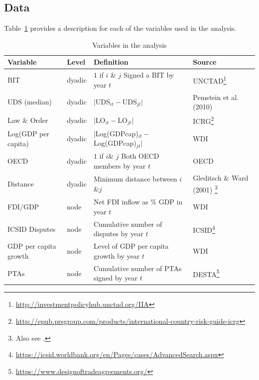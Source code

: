 \documentclass[a4paper, 12pt]{article}
\begin{document}
\subsection{Data}

Table~\ref{tab:vars} provides a description for each of the variables used in the analysis.

\begin{table}[ht]
\footnotesize
  \centering
  \caption{Variables in the analysis}\label{tab:modelSpec}
  \begin{tabular}{llp{7cm}p{4cm}}  
    \toprule
    Variable & Level & Definition & Source \\
    \midrule
    BIT & dyadic & $1$ if $i$ \& $j$ Signed a BIT by year $t$ & UNCTAD\footnote{\url{http://investmentpolicyhub.unctad.org/IIA}}\\
    UDS (median) & dyadic & $|$UDS$_{it} - $UDS$_{jt}|$ &Pemstein et al. (2010)\nocite{pemstein:etal:2010}  \\
    Law \& Order & dyadic  &$|$LO$_{it} - $LO$_{jt}|$& ICRG\footnote{\url{http://epub.prsgroup.com/products/international-country-risk-guide-icrg}}\\
    Log(GDP per capita)  &dyadic& $|$Log(GDPcap)$_{it} - $Log(GDPcap)$_{jt}|$ & WDI \\
    OECD & dyadic& $1$ if $i$\& $j$ Both OECD members by year $t$&OECD \\
    Distance &dyadic&Minimum distance between $i$\&$j$ & Gleditsch \& Ward (2001) \nocite{gleditsch:ward:2001}\footnote{Also see \citet{weidmann:gleditsch:2015}.}\\
    FDI/GDP &node&Net FDI inflow as \% GDP in year $t$&WDI\\
    ICSID Disputes &node& Cumulative number of disputes by year $t$& ICSID\footnote{\url{https://icsid.worldbank.org/en/Pages/cases/AdvancedSearch.aspx}} \\
    GDP per capita growth&node& Level of GDP per capita growth by year $t$ &WDI\\ 
    PTAs&node& Cumulative number of PTAs signed by year $t$& DESTA\footnote{\url{https://www.designoftradeagreements.org/}}\\
    \bottomrule
  \end{tabular}
  \label{tab:vars}
\end{table}
\FloatBarrier
\end{document}
